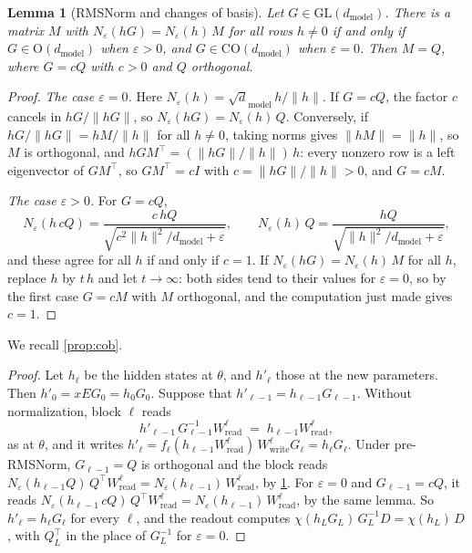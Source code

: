 \documentclass[10pt]{article}
\newtheorem{lemma}[theorem]{Lemma}
\theoremstyle{definition}
\theoremstyle{remark}
\newcommand{\Wread}{W_{\mathrm{read}}}
\newcommand{\Wwrite}{W_{\mathrm{write}}}
\newcommand{\dm}{d_{\mathrm{model}}}
\newcommand{\GL}{\mathrm{GL}}
\newcommand{\Ort}{\mathrm{O}}
\newcommand{\CO}{\mathrm{CO}}
\newcommand{\norm}[1]{\lVert #1\rVert}
\begin{document}
\begin{lemma}[RMSNorm and changes of basis]\label{lem:rms}
Let $G \in \GL(\dm)$. There is a matrix $M$ with $N_\varepsilon(hG) = N_\varepsilon(h)\,M$ for all rows $h \neq 0$ if and only if $G \in \Ort(\dm)$ when $\varepsilon > 0$, and $G \in \CO(\dm)$ when $\varepsilon = 0$. Then $M = Q$, where $G = cQ$ with $c > 0$ and $Q$ orthogonal.
\end{lemma}
\begin{proof}
\emph{The case $\varepsilon = 0$.} Here $N_\varepsilon(h) = \sqrt \dm\,h/\norm{h}$. If $G = cQ$, the factor $c$ cancels in $hG/\norm{hG}$, so $N_\varepsilon(hG) = N_\varepsilon(h)\,Q$. Conversely, if $hG/\norm{hG} = hM/\norm{h}$ for all $h \neq 0$, taking norms gives $\norm{hM} = \norm{h}$, so $M$ is orthogonal, and $hGM^\top = (\norm{hG}/\norm{h})\,h$: every nonzero row is a left eigenvector of $GM^\top$, so $GM^\top = cI$ with $c = \norm{hG}/\norm{h} > 0$, and $G = cM$.

\emph{The case $\varepsilon > 0$.} For $G = cQ$,
\[
N_\varepsilon(h\,cQ) = \frac{c\,hQ}{\sqrt{c^2\norm{h}^2/\dm + \varepsilon}}, \qquad N_\varepsilon(h)\,Q = \frac{hQ}{\sqrt{\norm{h}^2/\dm + \varepsilon}} ,
\]
and these agree for all $h$ if and only if $c = 1$. If $N_\varepsilon(hG) = N_\varepsilon(h)\,M$ for all $h$, replace $h$ by $t\,h$ and let $t \to \infty$: both sides tend to their values for $\varepsilon = 0$, so by the first case $G = cM$ with $M$ orthogonal, and the computation just made gives $c = 1$.
\end{proof}

We recall \cref{prop:cob}.
\propCob*

\begin{proof}
Let $h_\ell$ be the hidden states at $\theta$, and $h'_\ell$ those at the new parameters. Then $h'_0 = xEG_0 = h_0G_0$. Suppose that $h'_{\ell-1} = h_{\ell-1}G_{\ell-1}$. Without normalization, block $\ell$ reads
\[
h'_{\ell-1}\,G_{\ell-1}^{-1}\Wread^{\ell} \;=\; h_{\ell-1}\Wread^{\ell} ,
\]
as at $\theta$, and it writes $h'_\ell = f_\ell(h_{\ell-1}\Wread^{\ell})\,\Wwrite^{\ell}G_\ell = h_\ell G_\ell$. Under pre-RMSNorm, $G_{\ell-1} = Q$ is orthogonal and the block reads $N_\varepsilon(h_{\ell-1}Q)\,Q^\top\Wread^{\ell} = N_\varepsilon(h_{\ell-1})\,\Wread^{\ell}$, by \cref{lem:rms}. For $\varepsilon = 0$ and $G_{\ell-1} = cQ$, it reads $N_\varepsilon(h_{\ell-1}\,cQ)\,Q^\top\Wread^{\ell} = N_\varepsilon(h_{\ell-1})\,\Wread^{\ell}$, by the same lemma. So $h'_\ell = h_\ell G_\ell$ for every $\ell$, and the readout computes $\chi(h_LG_L)\,G_L^{-1}D = \chi(h_L)\,D$, with $Q_L^\top$ in the place of $G_L^{-1}$ for $\varepsilon = 0$.
\end{proof}
\end{document}
